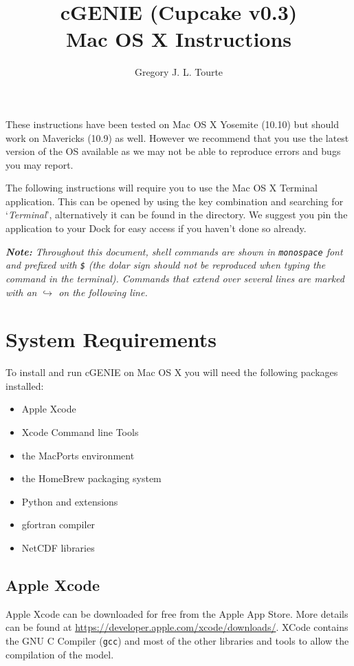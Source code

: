 \documentclass{scrartcl}
\title{cGENIE (Cupcake v0.3)\\
Mac OS X Instructions}
\author{Gregory J. L. Tourte}
\begin{document}
\maketitle

These instructions have been tested on Mac OS X Yosemite (10.10) but should
work on Mavericks (10.9) as well. However we recommend that you use the latest
version of the OS available as we may not be able to reproduce errors and bugs
you may report.

The following instructions will require you to use the Mac OS X Terminal
application. This can be opened by using the \keys{\cmd+\SPACE} key combination
and searching for `\textit{Terminal}', alternatively it can be found in the
 directory. We suggest you pin
the application to your Dock for easy access if you haven't done so already.

{\itshape \textbf{Note:} Throughout this document, shell commands are shown in
\textup{\texttt{monospace}} font and prefixed with \textup{\texttt{\$}} (the
dolar sign should not be reproduced when typing the command in the terminal).
Commands that extend over several lines are marked with an
{\tiny\ensuremath{\hookrightarrow}} on the following line.}

\section{System Requirements}

To install and run cGENIE on Mac OS X you will need the following packages
installed:

\begin{itemize}
	\item Apple Xcode
	\item Xcode Command line Tools
	\item the MacPorts environment
	\item the HomeBrew packaging system 
	\item Python and extensions
	\item gfortran compiler 
	\item NetCDF libraries
\end{itemize}

\subsection{Apple Xcode}

Apple Xcode can be downloaded for free from the Apple App Store. More details
can be found at \url{https://developer.apple.com/xcode/downloads/}. XCode
contains the GNU C Compiler (\texttt{gcc}) and most of the other libraries and
tools to allow the compilation of the model.
\end{document}
